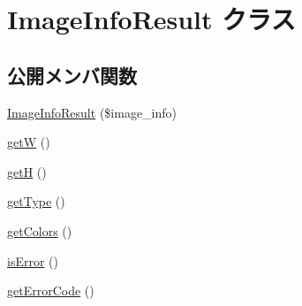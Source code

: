 \hypertarget{class_image_info_result}{}\section{Image\+Info\+Result クラス}
\label{class_image_info_result}
\subsection*{公開メンバ関数}
\begin{DoxyCompactItemize}
\item 
\hyperlink{class_image_info_result_a6f13ef7887e6e9d30a17d48dd49a0459}{Image\+Info\+Result} (\$image\+\_\+info)
\item 
\hyperlink{class_image_info_result_a0f0bdd9622bed1b100fbbc342babf48b}{get\+W} ()
\item 
\hyperlink{class_image_info_result_a432f8a200e08c665417025b3f03c64a5}{get\+H} ()
\item 
\hyperlink{class_image_info_result_a0be241535485256c6f67fbd011909a8d}{get\+Type} ()
\item 
\hyperlink{class_image_info_result_acc470f70a838a91c9072c151f21190be}{get\+Colors} ()
\item 
\hyperlink{class_image_info_result_a2a30efa411e4c3c31a2e8132ba58ebce}{is\+Error} ()
\item 
\hyperlink{class_image_info_result_a0e359341fdff21e3821e9e5238bf6946}{get\+Error\+Code} ()
\end{DoxyCompactItemize}
